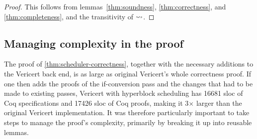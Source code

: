 {\begin{theorem}
  \begin{proof}
    This follows from lemmas~\ref{thm:soundness}, \ref{thm:correctness}, and \ref{thm:completeness}, and the transitivity of $\mathrel{\leadsto}$.
  \end{proof}

%

\end{theorem}

\subsection{Managing complexity in the proof}

The proof of \cref{thm:scheduler-correctness}, together with the necessary additions to the Vericert back end, is as large as original Vericert's whole correctness proof. If one then adds the proofs of the if-conversion pass and the changes that had to be made to existing passes, Vericert with hyperblock scheduling has 16681 sloc of Coq specifications and 17426 sloc of Coq proofs, making it 3$\times$ larger than the original Vericert implementation. It was therefore particularly important to take steps to manage the proof's complexity, primarily by breaking it up into reusable lemmas.

}
